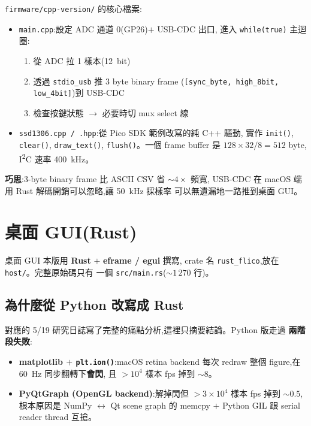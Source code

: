 \documentclass[12pt,a4paper]{article}
\begin{document}
\texttt{firmware/cpp-version/} 的核心檔案:

\begin{itemize}[leftmargin=2em,itemsep=0pt]
	\item \texttt{main.cpp}:設定 ADC 通道 0(GP26)\(+\) USB-CDC 出口,
	      進入 \texttt{while(true)} 主迴圈:
	      \begin{enumerate}[leftmargin=2em,itemsep=0pt]
		      \item 從 ADC 拉 1 樣本(\SI{12}{bit})
		      \item 透過 \texttt{stdio\_usb} 推 3 byte binary frame
		            (\texttt{[sync\_byte, high\_8bit, low\_4bit]})到 USB-CDC
		      \item 檢查按鍵狀態 \(\to\) 必要時切 mux select 線
	      \end{enumerate}
	\item \texttt{ssd1306.cpp / .hpp}:從 Pico SDK 範例改寫的純 C++ 驅動,
	      實作 \texttt{init()}, \texttt{clear()}, \texttt{draw\_text()},
	      \texttt{flush()}。一個 frame buffer 是 \(128 \times 32 / 8 = 512\) byte,
	      I\textsuperscript{2}C 速率 \SI{400}{\kilo\hertz}。
\end{itemize}

\textbf{巧思}:3-byte binary frame 比 ASCII CSV 省 \(\sim 4 \times\) 頻寬,
USB-CDC 在 macOS 端用 Rust 解碼開銷可以忽略,讓 \SI{50}{\kilo\hertz} 採樣率
可以無遺漏地一路推到桌面 GUI。

\section{桌面 GUI(Rust)}

桌面 GUI 本版用 \textbf{Rust} \(+\) \textbf{eframe / egui} 撰寫,
crate 名 \texttt{rust\_flico},放在 \texttt{host/}。完整原始碼只有
一個 \texttt{src/main.rs}(\(\sim 1\,270\) 行)。

\subsection{為什麼從 Python 改寫成 Rust}

對應的 5/19 研究日誌寫了完整的痛點分析,這裡只摘要結論。Python 版走過
\textbf{兩階段失敗}:

\begin{itemize}[leftmargin=2em,itemsep=0pt]
	\item \textbf{matplotlib \(+\) \texttt{plt.ion()}}:macOS retina backend
	      每次 redraw 整個 figure,在 \SI{60}{\hertz} 同步翻轉下\textbf{會閃},
	      且 \(> 10^4\) 樣本 fps 掉到 \(\sim 8\)。
	\item \textbf{PyQtGraph (OpenGL backend)}:解掉閃但 \(> 3 \times 10^4\) 樣本
	      fps 掉到 \(\sim 0.5\),根本原因是 NumPy \(\leftrightarrow\) Qt scene graph 的
	      memcpy \(+\) Python GIL 跟 serial reader thread 互搶。
\end{itemize}
\end{document}
